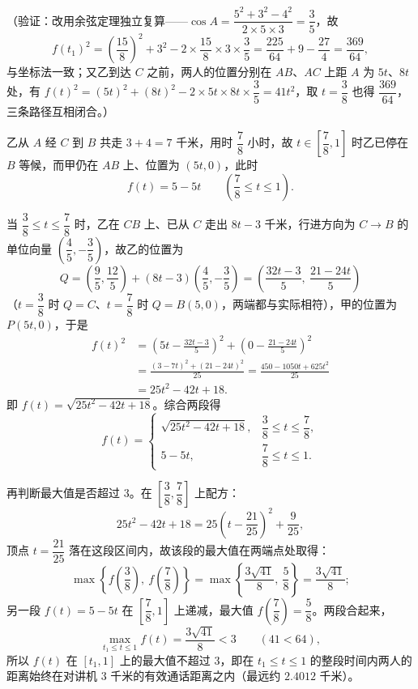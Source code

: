\begin{answer}
（验证：改用余弦定理独立复算——\(\cos A=\dfrac{5^{2}+3^{2}-4^{2}}{2\times5\times3}=\dfrac{3}{5}\)，故
\nopagebreak[4]
\[
f(t_{1})^{2}=\left(\frac{15}{8}\right)^{2}+3^{2}-2\times\frac{15}{8}\times3\times\frac{3}{5}=\frac{225}{64}+9-\frac{27}{4}=\frac{369}{64},
\]
与坐标法一致；又乙到达 \(C\) 之前，两人的位置分别在 \(AB\)、\(AC\) 上距 \(A\) 为 \(5t\)、\(8t\) 处，有 \(f(t)^{2}=(5t)^{2}+(8t)^{2}-2\times5t\times8t\times\dfrac{3}{5}=41t^{2}\)，取 \(t=\dfrac{3}{8}\) 也得 \(\dfrac{369}{64}\)，三条路径互相闭合。）


乙从 \(A\) 经 \(C\) 到 \(B\) 共走 \(3+4=7\) 千米，用时 \(\dfrac{7}{8}\) 小时，故 \(t\in\left[\dfrac{7}{8},1\right]\) 时乙已停在 \(B\) 等候，而甲仍在 \(AB\) 上、位置为 \((5t,0)\)，此时
\nopagebreak[4]
\[
f(t)=5-5t\qquad\left(\frac{7}{8}\leqslant t\leqslant1\right).
\]

当 \(\dfrac{3}{8}\leqslant t\leqslant\dfrac{7}{8}\) 时，乙在 \(CB\) 上、已从 \(C\) 走出 \(8t-3\) 千米，行进方向为 \(C\to B\) 的单位向量 \(\left(\dfrac{4}{5},-\dfrac{3}{5}\right)\)，故乙的位置为
\nopagebreak[4]
\[
Q=\left(\frac{9}{5},\frac{12}{5}\right)+(8t-3)\left(\frac{4}{5},-\frac{3}{5}\right)=\left(\frac{32t-3}{5},\ \frac{21-24t}{5}\right)
\]
（\(t=\dfrac{3}{8}\) 时 \(Q=C\)、\(t=\dfrac{7}{8}\) 时 \(Q=B(5,0)\)，两端都与实际相符），甲的位置为 \(P(5t,0)\)，于是
\nopagebreak[4]
\[
\begin{aligned}
f(t)^{2}&=\left(5t-\frac{32t-3}{5}\right)^{2}+\left(0-\frac{21-24t}{5}\right)^{2}\\
&=\frac{(3-7t)^{2}+(21-24t)^{2}}{25}=\frac{450-1050t+625t^{2}}{25}\\
&=25t^{2}-42t+18.
\end{aligned}
\]
即 \(f(t)=\sqrt{25t^{2}-42t+18}\)。综合两段得
\nopagebreak[4]
\[
f(t)=\begin{cases}
\sqrt{25t^{2}-42t+18}, & \dfrac{3}{8}\leqslant t\leqslant\dfrac{7}{8},\\
5-5t, & \dfrac{7}{8}\leqslant t\leqslant1.
\end{cases}
\]

再判断最大值是否超过 \(3\)。在 \(\left[\dfrac{3}{8},\dfrac{7}{8}\right]\) 上配方：
\nopagebreak[4]
\[
25t^{2}-42t+18=25\left(t-\frac{21}{25}\right)^{2}+\frac{9}{25},
\]
顶点 \(t=\dfrac{21}{25}\) 落在这段区间内，故该段的最大值在两端点处取得：
\nopagebreak[4]
\[
\max\left\{f\left(\frac{3}{8}\right),\ f\left(\frac{7}{8}\right)\right\}=\max\left\{\frac{3\sqrt{41}}{8},\ \frac{5}{8}\right\}=\frac{3\sqrt{41}}{8};
\]
另一段 \(f(t)=5-5t\) 在 \(\left[\dfrac{7}{8},1\right]\) 上递减，最大值 \(f\left(\dfrac{7}{8}\right)=\dfrac{5}{8}\)。两段合起来，
\nopagebreak[4]
\[
\max_{t_{1}\leqslant t\leqslant1}f(t)=\frac{3\sqrt{41}}{8}<3\qquad(41<64),
\]
所以 \(f(t)\) 在 \([t_{1},1]\) 上的最大值不超过 \(3\)，即在 \(t_{1}\leqslant t\leqslant1\) 的整段时间内两人的距离始终在对讲机 \(3\) 千米的有效通话距离之内（最远约 \(2.4012\) 千米）。


\end{answer}
